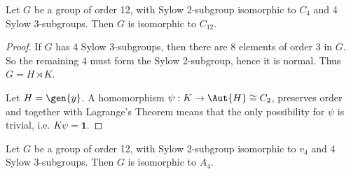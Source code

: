 \begin{lemma}
    Let \(G\) be a group of order 12, with Sylow 2-subgroup isomorphic to \(C_4\) and 4 Sylow 3-subgroups.
    Then \(G\) is isomorphic to \(C_{12}\).
\end{lemma}

\begin{proof}
    If \(G\) has 4 Sylow 3-subgroups, then there are 8 elements of order 3 in \(G\).
    So the remaining 4 must form the Sylow 2-subgroup, hence it is normal.
    Thus \(G = H \rtimes K\).

    Let \(H = \gen{y}\).
    A homomorphism \(\psi:K \to \Aut{H} \cong C_2\), preserves order and together with Lagrange's Theorem means that
    the only possibility for \(\psi\) is trivial, i.e. \(K\psi = \bm{1}\).
\end{proof}

\begin{lemma}\label{lem:uses_c3_automorphism}
    Let \(G\) be a group of order 12, with Sylow 2-subgroup isomorphic to \(v_4\) and 4 Sylow 3-subgroups.
    Then \(G\) is isomorphic to \(A_4\).
\end{lemma}

